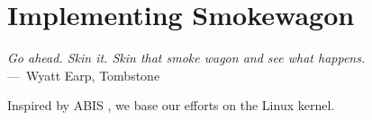 
\chapter{Implementing Smokewagon}
\label{ch:Implementation}

\begin{epigraph}
	\emph{Go ahead. Skin it. Skin that smoke wagon and see what happens.} \\
	---~Wyatt Earp, Tombstone
\end{epigraph}

Inspired by ABIS \cite{amit_optimizing_2017}, we base our efforts on the Linux kernel.

\endinput